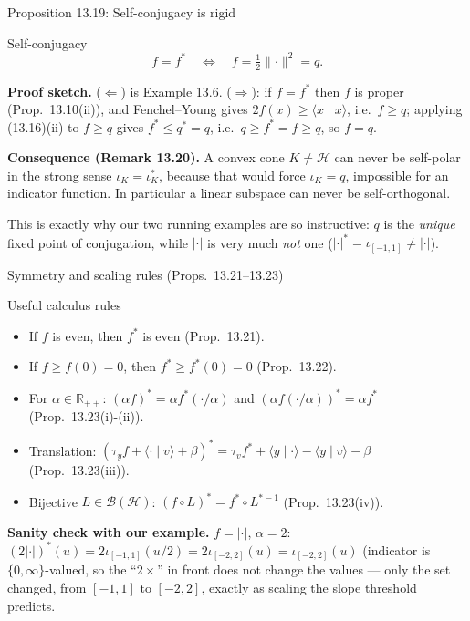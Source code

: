 \documentclass[aspectratio=169,10pt]{beamer}
\newcommand{\R}{\mathbb{R}}
\newcommand{\Hil}{\mathcal{H}}
\newcommand{\inner}[2]{\langle #1 \mid #2 \rangle}
\newcommand{\norm}[1]{\lVert #1 \rVert}
\newcommand{\conj}[1]{#1^{*}}
\begin{document}
\begin{frame}{Proposition 13.19: Self-conjugacy is rigid}
  \begin{alertblock}{Self-conjugacy}
    \[
      f = \conj f \quad\Longleftrightarrow\quad f = \tfrac12\norm{\cdot}^2 = q.
    \]
  \end{alertblock}
  \textbf{Proof sketch.} ($\Leftarrow$) is Example 13.6. ($\Rightarrow$): if
  $f=\conj f$ then $f$ is proper (Prop.\ 13.10(ii)), and Fenchel--Young
  gives $2f(x)\ge\inner xx$, i.e.\ $f\ge q$; applying (13.16)(ii) to $f\ge
  q$ gives $\conj f \le \conj q = q$, i.e.\ $q\ge \conj f = f \ge q$, so
  $f=q$.

  \medskip
  \textbf{Consequence (Remark 13.20).} A convex cone $K\ne\Hil$ can never
  be self-polar in the strong sense $\iota_K = \iota_K^{*}$, because that
  would force $\iota_K=q$, impossible for an indicator function. In
  particular a linear subspace can never be self-orthogonal.

  \medskip
  This is exactly why our two running examples are so instructive: $q$
  is the \emph{unique} fixed point of conjugation, while $|\cdot|$ is very
  much \emph{not} one ($\conj{|\cdot|}=\iota_{[-1,1]}\ne|\cdot|$).
\end{frame}

\begin{frame}{Symmetry and scaling rules (Props.\ 13.21--13.23)}
  \begin{block}{Useful calculus rules}
    \begin{itemize}
      \item If $f$ is even, then $\conj f$ is even (Prop.\ 13.21).
      \item If $f\ge f(0)=0$, then $\conj f\ge \conj f(0)=0$ (Prop.\ 13.22).
      \item For $\alpha\in\R_{++}$: $(\alpha f)^{*}=\alpha f^{*}(\cdot/\alpha)$
        and $(\alpha f(\cdot/\alpha))^{*} = \alpha \conj f$ (Prop.\ 13.23(i)-(ii)).
      \item Translation: $(\tau_y f + \inner\cdot v+\beta)^{*} = \tau_v
        \conj f + \inner y\cdot - \inner yv - \beta$ (Prop.\ 13.23(iii)).
      \item Bijective $L\in\mathcal B(\Hil)$: $(f\circ L)^{*} = \conj f\circ
        L^{*-1}$ (Prop.\ 13.23(iv)).
    \end{itemize}
  \end{block}
  \textbf{Sanity check with our example.} $f=|\cdot|$, $\alpha=2$:
  $(2|\cdot|)^{*}(u) = 2\iota_{[-1,1]}(u/2) = 2\iota_{[-2,2]}(u) =
  \iota_{[-2,2]}(u)$ (indicator is $\{0,\infty\}$-valued, so the ``$2\times$''
  in front does not change the values --- only the set changed, from
  $[-1,1]$ to $[-2,2]$, exactly as scaling the slope threshold predicts.
\end{frame}
\end{document}
